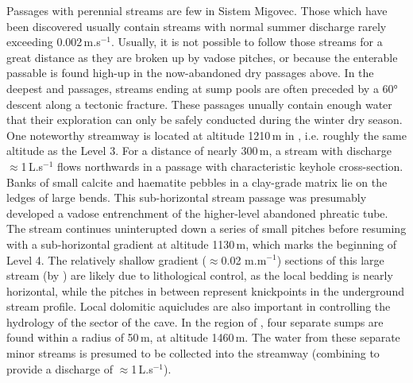 Passages with perennial streams are few in Sistem Migovec. 
Those which have been discovered usually contain streams with normal summer discharge rarely exceeding  0.002\,m.s$^{-1}$. 
Usually, it is not possible to follow those streams for a great distance as they are broken up by vadose pitches, or because the enterable passable is found high-up in the now-abandoned dry passages above. 
In the deepest  and  passages, streams ending at sump pools are often preceded by a 60° descent along a tectonic fracture. 
These passages unually contain enough water that their exploration can only be safely conducted during the winter dry season. 
One noteworthy streamway is located at altitude 1210\,m in , i.e. roughly the same altitude as the Level 3. For a distance of nearly 300\,m, a stream with discharge $\approx$1\,L.s$^{-1}$ flows northwards in a passage with characteristic keyhole cross-section. 
Banks of small calcite and haematite pebbles in a clay-grade matrix lie on the ledges of large bends. 
This sub-horizontal stream passage was presumably developed a vadose entrenchment of the higher-level abandoned phreatic tube. 
The stream continues uninterupted down a series of small pitches before resuming with a sub-horizontal gradient at altitude 1130\,m, which marks the beginning of Level 4. 
The relatively shallow gradient ($\approx$0.02 m.m$^{-1}$) sections of this large stream (by ) are likely due to lithological control, as the local bedding is nearly horizontal, while the pitches in between represent knickpoints in the underground stream profile.
Local dolomitic aquicludes are also important in controlling the hydrology of the  sector of the cave. In the region of , four separate sumps are found within a radius of 50\,m, at altitude 1460\,m. The water from these separate minor streams is presumed to be collected into the  streamway (combining to provide a discharge of  $\approx$1\,L.s$^{-1}$).

